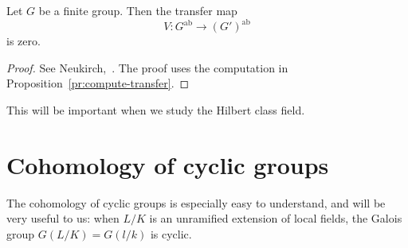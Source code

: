\begin{thm}
Let $G$ be a finite group. Then the transfer map
\[
V:G^{\text{ab}}\to (G')^{\text{ab}}
\]
is zero.
\end{thm}
\begin{proof}
See Neukirch,~\cite[VI.7.6]{Ne99}. The proof uses the computation in Proposition~\ref{pr:compute-transfer}.
\end{proof}
This will be important when we study the Hilbert class field.

\section{Cohomology of cyclic groups}
The cohomology of cyclic groups is especially easy to understand, and will be very useful to us: when $L/K$ is an unramified extension of local fields, the Galois group $G(L/K)=G(l/k)$ is cyclic.

